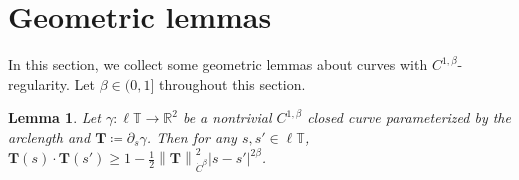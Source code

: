 \documentclass[reqno,centertags,12pt]{amsart}
\newtheorem{lemma}[theorem]{Lemma}
\theoremstyle{definition}
\numberwithin{equation}{section}
\newcommand{\abs}[1]{\left\lvert#1\right\rvert}
\newcommand{\norm}[1]{\left\|#1\right\|}
\newcommand{\bbR}{{\mathbb{R}}}
\newcommand{\bbT}{{\mathbb{T}}}
\begin{document}
\section{Geometric lemmas}

In this section, we collect some geometric lemmas about curves with $C^{1,\beta}$-regularity.
Let $\beta\in(0,1]$ throughout this section.

\begin{lemma}\label{L3.1}
    Let $\gamma\colon\ell\bbT\to\bbR^{2}$ be a nontrivial $C^{1,\beta}$ closed curve
    parameterized by the arclength and $\mathbf{T}\coloneqq\partial_{s}\gamma$.
    Then for any $s,s'\in\ell\bbT$,
    $\mathbf{T}(s)\cdot\mathbf{T}(s') \geq
    1 - \frac{1}{2}\norm{\mathbf{T}}_{\dot{C}^{\beta}}^{2}\abs{s - s'}^{2\beta}$.
\end{lemma}
\end{document}
